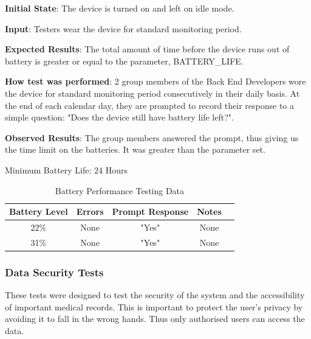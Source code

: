 \documentclass[12pt, titlepage]{article}
\begin{document}
\begin{enumerate}
  \textbf{Initial State}: The device is turned on and left on idle mode.

  \textbf{Input}: Testers wear the device for standard monitoring period.

  \textbf{Expected Results}: The total amount of time before the device runs out of battery is greater or equal to the parameter, BATTERY\_LIFE.

  \textbf{How test was performed}: 2 group members of the Back End Developers wore the device for standard monitoring period consecutively in their daily basis. At the end of each calendar day, they are prompted to record their response to a simple question: "Does the device still have battery life left?".

  \textbf{Observed Results}: The group members answered the prompt, thus giving us the time limit on the batteries. It was greater than the parameter set.

Minimum Battery Life: 24 Hours

\begin{table}[H]
\centering
  \begin{tabular}{| c | c | c | c | c |}
\hline
    \textbf{Battery Level} & \textbf{Errors} & \textbf{Prompt Response} & \textbf{Notes }\\
\hline
22\% & None & "Yes" & None \\
\hline
31\% & None & "Yes" & None \\
\hline
  \end{tabular}
\caption{Battery Performance Testing Data}
\end{table}


\end{enumerate}

\subsubsection{Data Security Tests}

These tests were designed to test the security of the system and the accessibility of important medical records. This is important to protect the user's privacy by avoiding it to fall in the wrong hands. Thus only authorised users can access the data.
\end{document}
